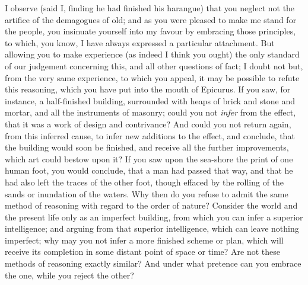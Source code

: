 \documentclass[]{article}
\begin{document}
\begin{sectionbody}
\humeparagraph  I observe (said I, finding he had finished his harangue) that you neglect not the artifice of the demagogues of old; and as you were pleased to make me stand for the people, you insinuate yourself into my favour by embracing those principles, to which, you know, I have always expressed a particular attachment. But allowing you to make experience (as indeed I think you ought) the only standard of our judgement concerning this, and all other questions of fact; I doubt not but, from the very same experience, to which you appeal, it may be possible to refute this reasoning, which you have put into the mouth of Epicurus. If you saw, for instance, a half-finished building, surrounded with heaps of brick and stone and mortar, and all the instruments of masonry; could you not \emph{infer} from the effect, that it was a work of design and contrivance? And could you not return again, from this inferred cause, to infer new additions to the effect, and conclude, that the building would soon be finished, and receive all the further improvements, which art could bestow upon it? If you saw upon the sea-shore the print of one human foot, you would conclude, that a man had passed that way, and that he had also left the traces of the other foot, though effaced by the rolling of the sands or inundation of the waters. Why then do you refuse to admit the same method of reasoning with regard to the order of nature? Consider the world and the present life only as an imperfect building, from which you can infer a superior intelligence; and arguing from that superior intelligence, which can leave nothing imperfect; why may you not infer a more finished scheme or plan, which will receive its completion in some distant point of space or time? Are not these methods of reasoning exactly similar? And under what pretence can you embrace the one, while you reject the other?


\end{sectionbody}
\end{document}
